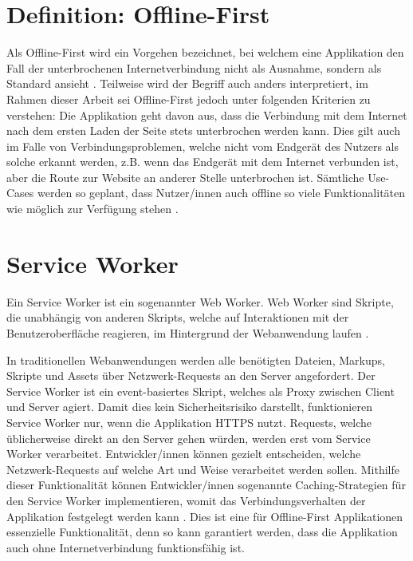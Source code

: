 \documentclass[a4paper, 12pt]{scrreprt}
\begin{document}
\section{Definition: Offline-First}\label{sec:DefinitionOfflineFirst}
Als Offline-First wird ein Vorgehen bezeichnet, bei welchem eine Applikation den Fall der unterbrochenen Internetverbindung nicht als Ausnahme, sondern als Standard ansieht \autocite{OnlineGoogleProgressiveWebApps}. Teilweise wird der Begriff auch anders interpretiert, im Rahmen dieser Arbeit sei Offline-First jedoch unter folgenden Kriterien zu verstehen: Die Applikation geht davon aus, dass die Verbindung mit dem Internet nach dem ersten Laden der Seite stets unterbrochen werden kann. Dies gilt auch im Falle von Verbindungsproblemen, welche nicht vom Endgerät des Nutzers als solche erkannt werden, z.B. wenn das Endgerät mit dem Internet verbunden ist, aber die Route zur Website an anderer Stelle unterbrochen ist. Sämtliche Use-Cases werden so geplant, dass Nutzer/innen auch offline so viele Funktionalitäten wie möglich zur Verfügung stehen \autocite{ArticleDesigningOfflineFirst}. 



\section{Service Worker}
\label{sec:serviceworker}

Ein Service Worker ist ein sogenannter Web Worker. Web Worker sind Skripte, die unabhängig von anderen Skripts, welche auf Interaktionen mit der Benutzeroberfläche reagieren, im Hintergrund der Webanwendung laufen \autocite{OnlineHTTPWorker}.

In traditionellen Webanwendungen werden alle benötigten Dateien, Markups, Skripte und Assets über Netzwerk-Requests an den Server angefordert. Der Service Worker ist ein event-basiertes Skript, welches als Proxy zwischen Client und Server agiert. Damit dies kein Sicherheitsrisiko darstellt, funktionieren Service Worker nur, wenn die Applikation \ac{HTTPS} nutzt. Requests, welche üblicherweise direkt an den Server gehen würden, werden erst vom Service Worker verarbeitet. Entwickler/innen können gezielt entscheiden, welche Netzwerk-Requests auf welche Art und Weise verarbeitet werden sollen. Mithilfe dieser Funktionalität können Entwickler/innen sogenannte Caching-Strategien für den Service Worker implementieren, womit das Verbindungsverhalten der Applikation festgelegt werden kann \autocite{OnlineServiceWorkersAnIntroduction}. Dies ist eine für Offline-First Applikationen essenzielle Funktionalität, denn so kann garantiert werden, dass die Applikation auch ohne Internetverbindung funktionsfähig ist. 
\end{document}
